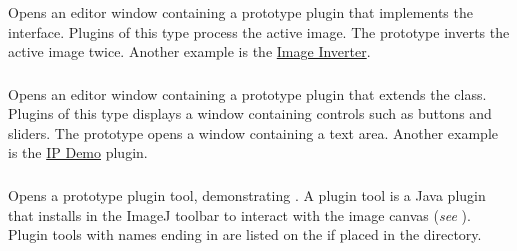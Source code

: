 \subsubsection{\protect{}\label{sub:Plugin-Filter}}

Opens an editor window containing a prototype plugin that implements
the  interface. Plugins of this type process the
active image. The prototype inverts the active image twice. Another
example is the \href{http://imagej.nih.gov/ij/plugins/inverter.html}{Image Inverter}.


\subsubsection{\protect{}\label{sub:Plugin-Frame}}

Opens an editor window containing a prototype plugin that extends
the  class. Plugins of this type displays a window
containing controls such as buttons and sliders. The prototype opens
a window containing a text area. Another example is the \href{http://imagej.nih.gov/ij/plugins/ip-demo.html}{IP Demo}
plugin.


\subsubsection[\protect\userinterface{Plugin Tool}]{\protect{}\label{sub:NewPluginTool}\feature{}}

Opens a prototype plugin tool, demonstrating 
\cite{C-PluginTool}. A plugin tool is a Java plugin that installs
in the ImageJ toolbar to interact with the image canvas (\emph{see}
). Plugin tools with names ending
in  are listed on the 
if placed in the  directory.




\subsubsection{\protect{}\label{sub:Text-Window...}}


